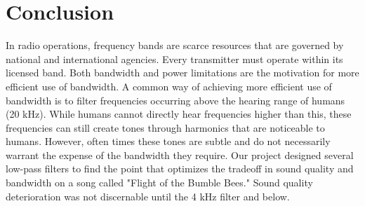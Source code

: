 \section{Conclusion}
In radio operations, frequency bands are scarce resources that are governed by national and international agencies. Every transmitter must operate within its licensed band.  Both bandwidth and power limitations are the motivation for more efficient use of bandwidth. A common way of achieving more efficient use of bandwidth is to filter frequencies occurring above the hearing range of humans (20 kHz).  While humans cannot directly hear frequencies higher than this, these frequencies can still create tones through harmonics that are noticeable to humans.  However, often times these tones are subtle and do not necessarily warrant the expense of the bandwidth they require.  Our project designed several low-pass filters to find the point that optimizes the tradeoff in sound quality and bandwidth on a song called "Flight of the Bumble Bees."  Sound quality deterioration was not discernable until the 4 kHz filter and below.
